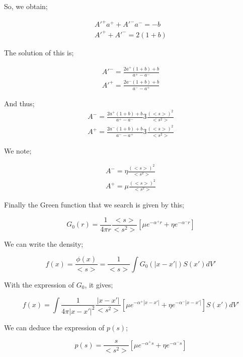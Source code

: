 \documentclass[a4paper, 12pt]{report}
\newcommand{\bl}{\big<}
\newcommand{\bg}{\big>}
\begin{document}
So, we obtain;

\begin{align}
A'^+a^+ + A'^-a^- =-b\\
A'^+ + A'^- = 2\left( 1 + b \right)
\end{align}

The solution of this is;

\begin{align}
A'^- = \frac{2a^+(1+b)+b}{a^+-a^-}\\
A'^+ = \frac{2a^-(1+b)+b}{a^--a^+}
\end{align}

And thus;
\begin{align}
A^- = \frac{2a^+(1+b)+b}{a^+-a^-} 3\frac{\left({\bl s \bg}\right)^2}{{{\bl s^2 \bg}}}\\
A^+ = \frac{2a^-(1+b)+b}{a^--a^+} 3\frac{\left({\bl s \bg}\right)^2}{{{\bl s^2 \bg}}}
\end{align}

We note;

\begin{align}
A^- = \eta\frac{\left({\bl s \bg}\right)^2}{{{\bl s^2 \bg}}}\\
A^+ = \mu\frac{\left({\bl s \bg}\right)^2}{{{\bl s^2 \bg}}}
\end{align}

Finally the Green function that we search is given by this;

\begin{equation}
G_0(r) = \frac{1}{4\pi r} \frac{{\bl s \bg}}{{{\bl s^2 \bg}}} \left[\mu e^{-\alpha^+ r} + \eta e^{-\alpha^- r} \right]
\end{equation}

We can write the density;

\begin{equation}
f(x) = \frac{\phi(x)}{{\bl s \bg}} = \frac{1}{{\bl s \bg}} \int G_0(|x-x'|) S(x') dV' 
\end{equation}

With the expression of $G_0$, it gives;

\begin{equation}
f(x) = \int \frac{1}{4\pi |x-x'|^2} \frac{|x-x'|}{{{\bl s^2 \bg}}} \left[\mu e^{-\alpha^+ |x-x'|} + \eta e^{-\alpha^- |x-x'|} \right]  S(x') dV' 
\end{equation}

We can deduce the expression of $p(s)$;

\begin{equation}
p(s) = \frac{s}{{{\bl s^2 \bg}}} \left[\mu e^{-\alpha^+ s} + \eta e^{-\alpha^- s}\right]
\end{equation}
\end{document}

